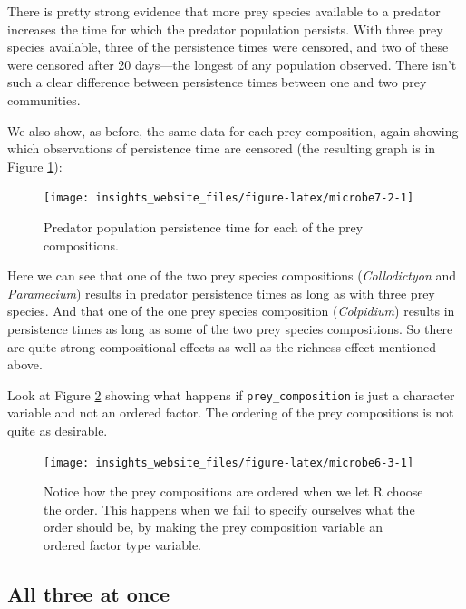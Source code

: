 \documentclass[]{book}
\begin{document}
There is pretty strong evidence that more prey species available to a predator increases the time for which the predator population persists. With three prey species available, three of the persistence times were censored, and two of these were censored after 20 days---the longest of any population observed. There isn't such a clear difference between persistence times between one and two prey communities.

We also show, as before, the same data for each prey composition, again showing which observations of persistence time are censored (the resulting graph is in Figure \ref{fig:microbe7-2}):

\begin{figure}

{\centering \texttt{[image: insights\_website\_files/figure-latex/microbe7-2-1]} 

}

\caption{Predator population persistence time for each of the prey compositions.}\label{fig:microbe7-2}
\end{figure}

Here we can see that one of the two prey species compositions (\emph{Collodictyon} and \emph{Paramecium}) results in predator persistence times as long as with three prey species. And that one of the one prey species composition (\emph{Colpidium}) results in persistence times as long as some of the two prey species compositions. So there are quite strong compositional effects as well as the richness effect mentioned above.

\begin{efficiency}
Look at Figure \ref{fig:microbe6-3} showing what happens if
\texttt{prey\_composition} is just a character variable and not an
ordered factor. The ordering of the prey compositions is not quite as
desirable.
\end{efficiency}

\begin{figure}

{\centering \texttt{[image: insights\_website\_files/figure-latex/microbe6-3-1]} 

}

\caption{Notice how the prey compositions are ordered when we let R choose the order. This happens when we fail to specify ourselves what the order should be, by making the prey composition variable an ordered factor type variable.}\label{fig:microbe6-3}
\end{figure}

\hypertarget{all-three-at-once}{%
\subsection{All three at once}\label{all-three-at-once}}
\end{document}
